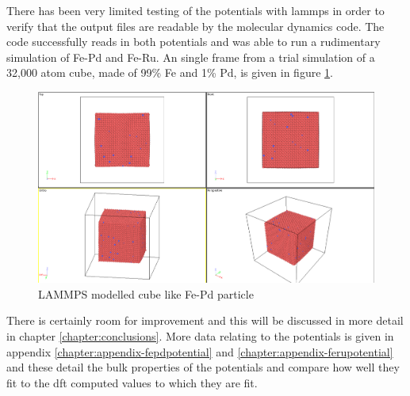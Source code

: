 There has been very limited testing of the potentials with \acrshort{lammps} in order to verify that the output files are readable by the molecular dynamics code.  The code successfully reads in both potentials and was able to run a rudimentary simulation of Fe-Pd and Fe-Ru.  An single frame from a trial simulation of a 32,000 atom cube, made of 99\% Fe and 1\% Pd, is given in figure \ref{fig:fepd-lammps-trial}.

\begin{figure}[htb]
\includegraphics[width=.94\linewidth]{chapters/potentials_fe_pd_ru/lammps/fepd_fct_cube_particle.png} 
\caption{LAMMPS modelled cube like Fe-Pd particle}
\label{fig:fepd-lammps-trial}
\end{figure}

There is certainly room for improvement and this will be discussed in more detail in chapter \ref{chapter:conclusions}.  More data relating to the potentials is given in appendix \ref{chapter:appendix-fepdpotential} and \ref{chapter:appendix-ferupotential} and these detail the bulk properties of the potentials and compare how well they fit to the \acrshort{dft} computed values to which they are fit.




